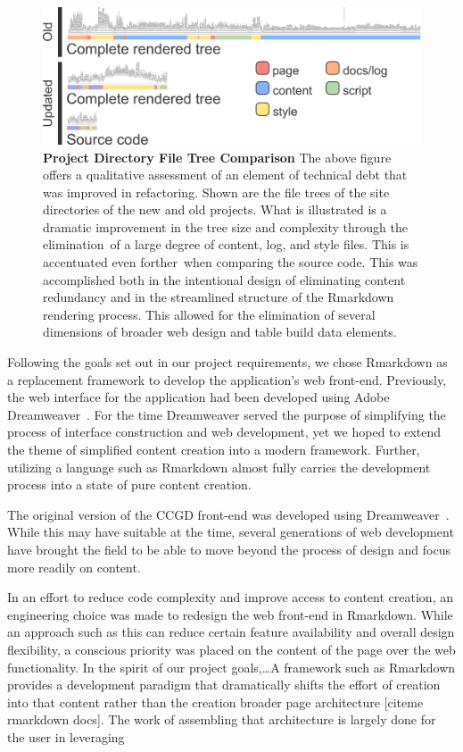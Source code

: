 \documentclass[10pt]{report}
\begin{document}
\begin{figure}[H]
    \centering
    \includegraphics[width=\textwidth]{fig/file_tree.png}
    \caption[Project Directory File Tree Comparison]{\textbf{Project Directory File Tree Comparison} The above figure offers a qualitative assessment of an element of technical debt that was improved in refactoring. Shown are the file trees of the site directories of the new and old projects. What is illustrated is a dramatic improvement in the tree size and complexity through the elimination of a large degree of content, log, and style files. This is accentuated even forther when comparing the source code. This was accomplished both in the intentional design of eliminating content redundancy and in the streamlined structure of the Rmarkdown rendering process. This allowed for the elimination of several dimensions of broader web design and table build data elements.}\label{fig:fileTree}
\end{figure}

Following the goals set out in our project requirements, we chose Rmarkdown as a replacement framework to develop the application's web front-end. Previously, the web interface for the application had been developed using Adobe Dreamweaver~\cite{Abbott2015}. For the time Dreamweaver served the purpose of simplifying the process of interface construction and web development, yet we hoped to extend the theme of simplified content creation into a modern framework. Further, utilizing a language such as Rmarkdown almost fully carries the development process into a state of pure content creation.

The original version of the CCGD front-end was developed using Dreamweaver~\cite{Abbott2015}. While this may have suitable at the time, several generations of web development have brought the field to be able to move beyond the process of design and focus more readily on content.

In an effort to reduce code complexity and improve access to content creation, an engineering choice was made to redesign the web front-end in Rmarkdown. While an approach such as this can reduce certain feature availability and overall design flexibility, a conscious priority was placed on the content of the page over the web functionality. In the spirit of our project goals,\ldots A framework such as Rmarkdown provides a development paradigm that dramatically shifts the effort of creation into that content rather than the creation broader page architecture [citeme rmarkdown docs]. The work of assembling that architecture is largely done for the user in leveraging
\end{document}
